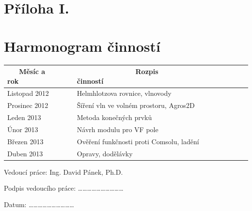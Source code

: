 \documentclass[12pt,a4paper,oneside]{article}
\numberwithin{equation}{section} %
\numberwithin{figure}{section} %
\numberwithin{table}{section} %
\begin{document}
\section*{Příloha I.}

\newpage
\section*{Harmonogram činností}
\begin{table}[h]
\begin{tabular}{|l|l|}
\hline 
\textbf{~~~Měsíc a rok~~~} & \textbf{~~~~~~~~~~~~~~~Rozpis činností~~~~~~~~~~~~~~~} \\ 
\hline 
Listopad 2012 & Helmhlotzova rovnice, vlnovody \\ 
\hline 
Prosinec 2012 & Šíření vln ve volném prostoru, Agros2D \\ 
\hline 
Leden 2013 & Metoda konečných prvků \\ 
\hline 
Únor 2013 & Návrh modulu pro VF pole \\ 
\hline 
Březen 2013 & Ověření funkčnosti proti Comsolu, ladění \\ 
\hline 
Duben 2013 & Opravy, dodělávky \\ 
\hline 
\end{tabular} 
\end{table}

\vspace*{20mm}
\begin{flushright}
Vedoucí práce: Ing. David Pánek, Ph.D.
\hspace{10mm}

\vspace*{10mm}
Podpis vedoucího práce: \ldots \ldots \ldots \ldots \ldots \ldots \ldots \ldots \ldots \ldots

\vspace*{10mm}
Datum: \ldots \ldots \ldots \ldots \ldots \ldots \ldots \ldots \ldots \ldots
\end{flushright}
\end{document}
